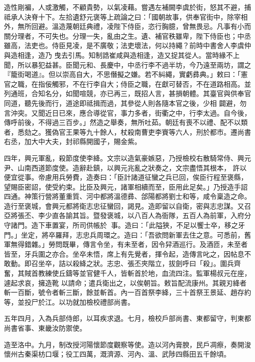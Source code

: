 \begin{pinyinscope}
 造性剛褊，人或激觸，不顧貴勢，以氣凌藉。嘗遇左補闕李虞於街，怒其不避，捕祗承人決脊十下。左拾遺舒元褒等上疏論之曰：「國朝故事，供奉官街中，除宰相外，無所回避。溫造蔑朝廷典禮，凌陛下侍臣，恣行胸臆，曾無畏忌。凡事有小而關分理者，不可失也。分理一失，亂由之生。遺、補官秩雖卑，陛下侍臣也；中丞雖高，法吏也。侍臣見凌，是不廣敬；法吏壞法，何以持繩？前時中書舍人李虞仲與造相逢，造乃
 曳去引馬。知制誥崔咸與造相逢，造又捉其從人。當時緣不上聞，所以暴犯益甚。臣聞元和、長慶中，中丞行李不過半坊，今乃遠至兩坊，謂之『籠街喝道』。但以崇高自大，不思僭擬之嫌。若不糾繩，實虧彞典。」敕曰：「憲官之職，在指佞觸邪，不在行李自大；侍臣之職，在獻可替否，不在道路相高。並列通班，合知名分，如聞喧競，亦已再三，既招人言，甚損朝體。其臺官與供奉官同道，聽先後而行，道途即祗揖而過，其參從人則各隨本官之後，少相
 闢避，勿言沖突。又聞近日已來，應合導從官，事力多者，街衢之中，行李太過。自今後，傳呼前後，不得過三百步。」然造之舉奏，無所吐茹。朝廷有喪不以禮、配不以類者，悉劾之。獲偽官王果等九十餘人，杖殺南曹吏李賨等六人，刑於都市。遷尚書右丞，加大中大夫，封祁縣開國子，賜金紫。



 四年，興元軍亂，殺節度使李絳。文宗以造氣豪嫉惡，乃授檢校右散騎常侍、興元尹、山南西道節度使。造辭赴鎮，以興元兆亂之狀奏之，文宗盡悟其根本，
 許以便宜從事。帝慮用兵勞費，造奏曰：「臣計諸道征蠻之兵已回，俟臣行程至褒縣，望賜臣密詔，使受約束。比臣及興元，諸軍相續而至，臣用此足矣。」乃授造手詔四通。神策行營將董重質、河中都將溫德彞、郃陽都將劉士和等，咸令稟造之命。造行至褒城，會興元都將衛志忠征蠻回，謁見。造即留以自衛，密與志忠謀。又召亞將張丕、李少直各諭其旨。暨發褒城，以八百人為衙隊，五百人為前軍，入府分守諸門。造下車置宴，所司供帳於
 事。造曰：「此隘狹，不足以饗士卒，移之牙門。」坐定，將卒羅拜，志忠兵周環之。造曰：「吾欲問新軍去住之意。可悉前，舊軍無得錯雜。」勞問既畢，傳言令坐，有未至者，因令舁酒巡行。及酒匝，未至者皆至，牙兵圍之亦合。坐卒未悟，席上有先覺者，揮令起，造傳言叱之，因帖息不敢動。即召坐卒，詰以殺絳之狀。志忠、張丕夾階立，拔劍呼曰「殺」。圍兵齊奮，其賊首教練使丘鑄等並官健千人，皆斬首於地，血流四注。監軍楊叔元在座，遽起求哀，擁造靴
 以請命；遣兵衛出之，以俟朝旨。敕旨配流康州。其親刃絳者斬一百斷，號令者斬三斷，餘並斬首。內一百首祭李絳，三十首祭王景延、趙存約等，並投尸於江。以功就加檢校禮部尚書。



 五年四月，入為兵部侍郎，以耳疾求退。七月，檢校戶部尚書、東都留守，判東都尚書省事、東畿汝防禦使。



 造至洛中。九月，制改授河陽懷節度觀察等使。造以河內膏腴，民戶凋瘵，奏開浚懷州古秦渠枋口堰；役工四萬，溉濟源、河內、溫、武陟四縣田五千餘頃。




\end{pinyinscope}
